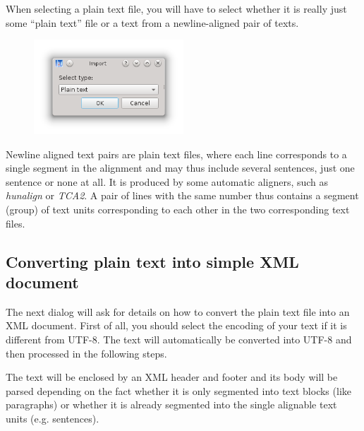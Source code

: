 \documentclass[a4paper,10pt,oneside]{book}
\begin{document}
When selecting a plain text file, you will have to select whether it is really just some ``plain text'' file or a text from a newline-aligned pair of texts.

\begin{figure}[htbf]
 \includegraphics[width=0.5\textwidth]{screenshots/text_import_type.png}
\end{figure}

Newline aligned text pairs are plain text files, where each line corresponds to a single segment in the alignment and may thus include several sentences, just one sentence or none at all. It is produced by some automatic aligners, such as \emph{hunalign} or \emph{TCA2}. A pair of lines with the same number thus contains a segment (group) of text units corresponding to each other in the two corresponding text files.

\subsection{Converting plain text into simple XML document}\label{ch:detail:managing_local:new:txt2xml}

The next dialog will ask for details on how to convert the plain text file into an XML document. First of all, you should select the encoding of your text if it is different from UTF-8. The text will automatically be converted into UTF-8 and then processed in the following steps.

The text will be enclosed by an XML header and footer and its body will be parsed depending on the fact whether it is only segmented into text blocks (like paragraphs) or whether it is already segmented into the single alignable text units (e.g. sentences).
\end{document}
